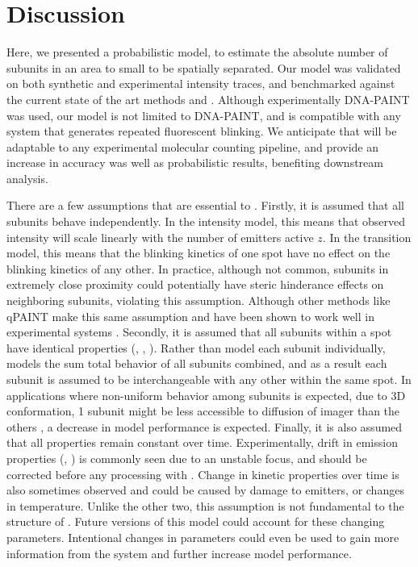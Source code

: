 \section{Discussion}
Here, we presented \ours a probabilistic model, to estimate the absolute 
number of subunits in an area to small to be spatially separated. 
    Our model was validated on both synthetic and experimental intensity traces,
    and benchmarked against the current state of the art methods \lbfcs and \qpaint.
    Although experimentally DNA-PAINT was used, our model is not 
    limited to DNA-PAINT, and is compatible with any system that generates repeated fluorescent blinking.
    We anticipate that \ours will be adaptable to any experimental molecular counting pipeline,
    and provide an increase in accuracy was well as probabilistic results, benefiting downstream analysis.

There are a few assumptions that are essential to \ours.
    Firstly, it is assumed that all subunits behave independently.
    In the intensity model, this means that observed intensity will scale linearly with the number of emitters active $z$.
    In the transition model, this means that the blinking kinetics of one spot have no effect on the blinking kinetics of any other.
    In practice, although not common, subunits in extremely close proximity could potentially 
    have steric hinderance effects on neighboring subunits, violating this assumption.
    Although other methods like qPAINT make this same assumption and have been shown to work well in experimental systems \cite{}. 
    Secondly, it is assumed that all subunits within a spot have identical properties (\pon, \poff, \re).
    Rather than model each subunit individually, \ours models the sum total behavior of all subunits combined, 
    and as a result each subunit is assumed to be interchangeable with any other within the same spot.
    In applications where non-uniform behavior among subunits is expected, \eg due to 3D conformation, 
    1 subunit might be less accessible to diffusion of imager than the others \cite{civitci_2020}, a decrease in model performance is expected.
    Finally, it is also assumed that all properties remain constant over time. 
    Experimentally, drift in emission properties (\re, \rb) is commonly seen due to an unstable focus, and should be corrected before any processing with \ours.
    Change in kinetic properties over time is also sometimes observed and could be caused by damage to emitters, or changes in temperature. 
    Unlike the other two, this assumption is not fundamental to the structure of \ours. 
    Future versions of this model could account for these changing parameters.
    Intentional changes in parameters could even be used to gain more information from the system and further increase model performance. 
    


